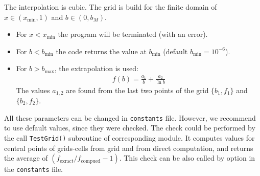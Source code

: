 \documentclass[prd,nofootinbib,eqsecnum,final]{revtex4}
\renewcommand{\(}{\left(}
\renewcommand{\)}{\right)}
\renewcommand{\[}{\left[}
\renewcommand{\]}{\right]}
\begin{document}
The interpolation is cubic. The grid is build for the finite domain of $x\in(x_{\min},1)$ and $b\in(0,b_M)$. 
\begin{itemize}
\item For $x<x_{\min}$ the program will be terminated (with an error). 
\item For $b<b_{\min}$ the code returns the value at $b_{\min}$ (default $b_{\min}=10^{-6}$). 
\item For $b>b_{\max}$, the extrapolation is used:
\begin{eqnarray}
f(b)=\frac{a_1}{b}+\frac{a_2}{\ln b}
\end{eqnarray}
The values $a_{1,2}$ are found from the last two points of the grid $\{b_1,f_1\}$ and $\{b_2,f_2\}$. 
\end{itemize}
All these parameters can be changed in \texttt{constants} file.  However, we recommend to use default values, since they were checked. The check could be performed by the call \texttt{TestGrid()} subroutine of corresponding module. It computes values for central points of grids-cells from grid and from direct computation, and returns the average of $(f_{\text{exract}}/f_{\text{compued}}-1)$. This check can be also called by option in the \texttt{constants} file.
\end{document}
